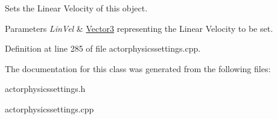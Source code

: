 Sets the Linear Velocity of this object. 


\begin{DoxyParams}{Parameters}
{\em LinVel} & \hyperlink{classphys_1_1Vector3}{Vector3} representing the Linear Velocity to be set. \\
\hline
\end{DoxyParams}


Definition at line 285 of file actorphysicssettings.cpp.



The documentation for this class was generated from the following files:\begin{DoxyCompactItemize}
\item 
actorphysicssettings.h\item 
actorphysicssettings.cpp\end{DoxyCompactItemize}
